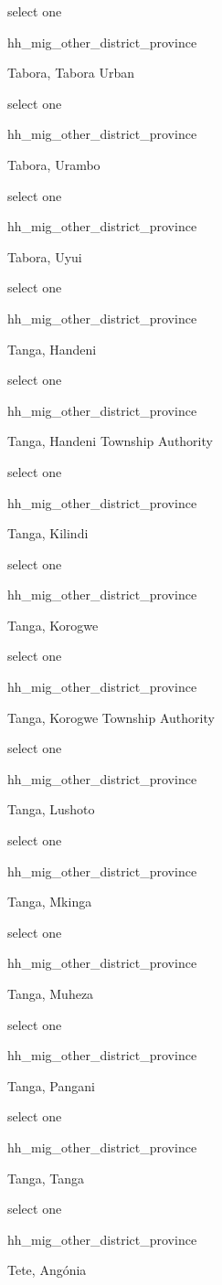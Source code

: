 \documentclass[]{article}
\begin{document}
select one

hh\_mig\_other\_district\_province

Tabora, Tabora Urban

select one

hh\_mig\_other\_district\_province

Tabora, Urambo

select one

hh\_mig\_other\_district\_province

Tabora, Uyui

select one

hh\_mig\_other\_district\_province

Tanga, Handeni

select one

hh\_mig\_other\_district\_province

Tanga, Handeni Township Authority

select one

hh\_mig\_other\_district\_province

Tanga, Kilindi

select one

hh\_mig\_other\_district\_province

Tanga, Korogwe

select one

hh\_mig\_other\_district\_province

Tanga, Korogwe Township Authority

select one

hh\_mig\_other\_district\_province

Tanga, Lushoto

select one

hh\_mig\_other\_district\_province

Tanga, Mkinga

select one

hh\_mig\_other\_district\_province

Tanga, Muheza

select one

hh\_mig\_other\_district\_province

Tanga, Pangani

select one

hh\_mig\_other\_district\_province

Tanga, Tanga

select one

hh\_mig\_other\_district\_province

Tete, Angónia
\end{document}
